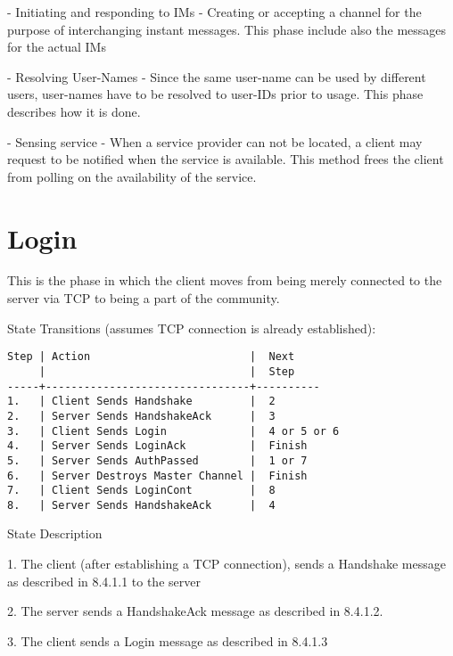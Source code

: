 \documentclass[titlepage,oneside]{book}
\begin{document}
\par{} - Initiating and responding to IMs - Creating or accepting a
channel for the purpose of interchanging instant messages. This phase
include also the messages for the actual IMs

\par{} - Resolving User-Names - Since the same user-name can be used
by different users, user-names have to be resolved to user-IDs prior
to usage. This phase describes how it is done.

\par{} - Sensing service - When a service provider can not be located,
a client may request to be notified when the service is
available. This method frees the client from polling on the
availability of the service.

\section{Login}

\par{} This is the phase in which the client moves from being merely
connected to the server via TCP to being a part of the community.

\par{} State Transitions (assumes TCP connection is already
established):

\begin{verbatim}
Step | Action                         |  Next
     |                                |  Step
-----+--------------------------------+----------
1.   | Client Sends Handshake         |  2
2.   | Server Sends HandshakeAck      |  3
3.   | Client Sends Login             |  4 or 5 or 6
4.   | Server Sends LoginAck          |  Finish
5.   | Server Sends AuthPassed        |  1 or 7
6.   | Server Destroys Master Channel |  Finish
7.   | Client Sends LoginCont         |  8
8.   | Server Sends HandshakeAck      |  4
\end{verbatim}

\par{} State Description

\par{} 1. The client (after establishing a TCP connection), sends a
Handshake message as described in 8.4.1.1 to the server

\par{} 2. The server sends a HandshakeAck message as described in
8.4.1.2.

\par{} 3. The client sends a Login message as described in 8.4.1.3
\end{document}
